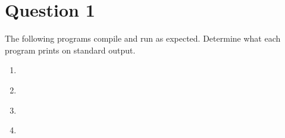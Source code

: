 
\section*{Question 1}

The following programs compile and run as expected.
Determine what each program prints on standard output.

\lstset{language=c,tabsize=4}
\begin{enumerate}[label=(\alph*)]
\item \lstinline{}

\item \lstinline{}

\item \lstinline{}

\item \lstinline{}

\end{enumerate}
